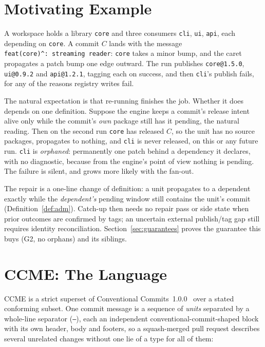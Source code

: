 \documentclass[sigconf,nonacm]{acmart}
\newcommand{\code}[1]{\texttt{#1}}
\newcommand{\G}[1]{G#1}
\begin{document}
\section{Motivating Example}
\label{sec:motivation}

A workspace holds a library \code{core} and three consumers \code{cli},
\code{ui}, \code{api}, each depending on \code{core}. A commit $C$ lands
with the message \code{feat(core)\^{}:~streaming reader}: \code{core}
takes a minor bump, and the caret propagates a patch bump one edge
outward. The run publishes \code{core@1.5.0}, \code{ui@0.9.2} and
\code{api@1.2.1}, tagging each on success, and then \code{cli}'s publish
fails, for any of the reasons registry writes fail.

The natural expectation is that re-running finishes the job. Whether it
does depends on one definition. Suppose the engine keeps a commit's
release intent alive only while the commit's \emph{own} package still has
it pending, the natural reading. Then on the second run \code{core}
has released $C$, so the unit has no source packages, propagates to
nothing, and \code{cli} is never released, on this or any future run.
\code{cli} is \emph{orphaned}: permanently one patch behind a dependency
it declares, with no diagnostic, because from the engine's point of view
nothing is pending. The failure is silent, and grows more likely with
the fan-out.

The repair is a one-line change of definition: a unit propagates to a
dependent exactly while the \emph{dependent's} pending window still
contains the unit's commit (Definition~\ref{def:adm}). Catch-up then
needs no repair pass or side state when prior outcomes are confirmed by tags;
an uncertain external publish/tag gap still requires identity reconciliation.
Section~\ref{sec:guarantees} proves the guarantee this buys (\G{2}, no
orphans) and its siblings.

\section{CCME: The Language}
\label{sec:ccme}

CCME is a strict superset of Conventional Commits~1.0.0~\cite{cc} over a
stated conforming subset. One commit message is a sequence of
\emph{units} separated by a whole-line separator (\code{---}), each an
independent conventional-commit-shaped block with its own header, body
and footers, so a squash-merged pull request describes several unrelated
changes without one lie of a type for all of them:
\end{document}
